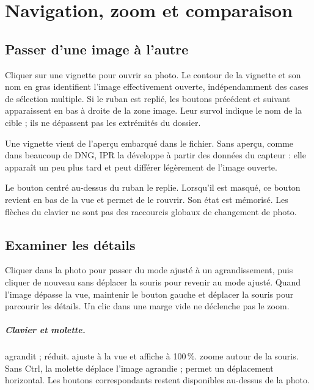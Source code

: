 \chapter{Navigation, zoom et comparaison}
\label{chap:navigation}
\section{Passer d’une image à l’autre}
Cliquer sur une vignette pour ouvrir sa photo. Le contour de la vignette et
son nom en gras identifient l’image effectivement ouverte, indépendamment des
cases de sélection multiple. Si le ruban est replié, les boutons précédent
et suivant apparaissent en bas à droite de la zone image. Leur survol indique
le nom de la cible ; ils ne dépassent pas les extrémités du dossier.

Une vignette vient de l’aperçu embarqué dans le fichier. Sans aperçu, comme dans
beaucoup de DNG, IPR la développe à partir des données du capteur : elle apparaît
un peu plus tard et peut différer légèrement de l’image ouverte.

Le bouton centré au-dessus du ruban le replie. Lorsqu’il est masqué, ce bouton
revient en bas de la vue et permet de le rouvrir. Son état est mémorisé.
Les flèches du clavier ne sont pas des raccourcis globaux de changement de photo.

\section{Examiner les détails}
Cliquer dans la photo pour passer du mode ajusté à un agrandissement, puis
cliquer de nouveau sans déplacer la souris pour revenir au mode ajusté.
Quand l’image dépasse la vue, maintenir le bouton gauche et déplacer la souris
pour parcourir les détails. Un clic dans une marge vide ne déclenche pas le zoom.

\paragraph{Clavier et molette.}
 agrandit ;  réduit.
 ajuste à la vue et  affiche à 100\,\%.
 zoome autour de la souris. Sans Ctrl, la molette déplace
l’image agrandie ;  permet un déplacement horizontal.
Les boutons correspondants restent disponibles au-dessus de la photo.


